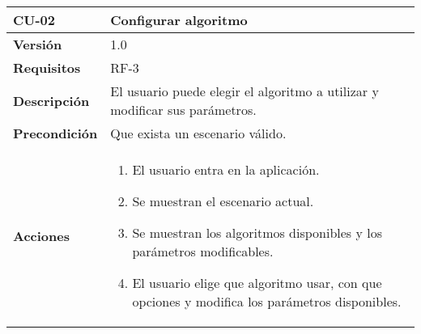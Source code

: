 \begin{longtable}[H]{@{}ll@{}}
\toprule
\begin{minipage}[b]{0.23\columnwidth}\raggedright\strut
\textbf{CU-02}\strut
\end{minipage} & \begin{minipage}[b]{0.71\columnwidth}\raggedright\strut
\textbf{Configurar algoritmo}\strut
\end{minipage}\tabularnewline
\midrule
\endhead

\begin{minipage}[t]{0.23\columnwidth}\raggedright\strut
\textbf{Versión}\strut
\end{minipage} & \begin{minipage}[t]{0.71\columnwidth}\raggedright\strut
1.0\strut
\end{minipage}\tabularnewline

\begin{minipage}[t]{0.23\columnwidth}\raggedright\strut
\textbf{Requisitos}\strut
\end{minipage} & \begin{minipage}[t]{0.71\columnwidth}\raggedright\strut
RF-3\strut
\end{minipage}\tabularnewline

\begin{minipage}[t]{0.23\columnwidth}\raggedright\strut
\textbf{Descripción}\strut
\end{minipage} & \begin{minipage}[t]{0.71\columnwidth}\raggedright\strut
El usuario puede elegir el algoritmo a utilizar y modificar sus parámetros.\strut
\end{minipage}\tabularnewline

\begin{minipage}[t]{0.23\columnwidth}\raggedright\strut
\textbf{Precondición}\strut
\end{minipage} & \begin{minipage}[t]{0.71\columnwidth}\raggedright\strut Que exista un escenario válido.\strut
\end{minipage}\tabularnewline

\begin{minipage}[t]{0.23\columnwidth}\raggedright\strut
\textbf{Acciones}\strut
\end{minipage} & \begin{minipage}[t]{0.71\columnwidth}\raggedright\strut
\begin{enumerate}
\def\labelenumi{\arabic{enumi}.}
\tightlist
\item
  El usuario entra en la aplicación.
\item
  Se muestran el escenario actual.
\item
  Se muestran los algoritmos disponibles y los parámetros modificables.
\item
  El usuario elige que algoritmo usar, con que opciones y modifica los parámetros disponibles.
\end{enumerate}\strut
\end{minipage}\tabularnewline


\end{longtable}
